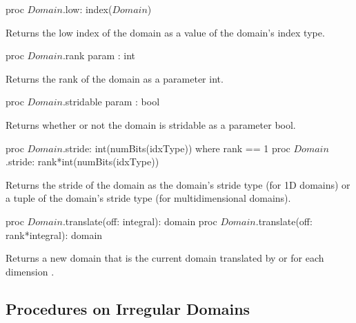 \begin{protohead}
proc $Domain$.low: index($Domain$)
\end{protohead}
\begin{protobody}
Returns the low index of the domain as a value of the domain's index
type.
\end{protobody}

\begin{protohead}
proc $Domain$.rank param : int
\end{protohead}
\begin{protobody}
Returns the rank of the domain as a parameter int.
\end{protobody}

\begin{protohead}
proc $Domain$.stridable param : bool
\end{protohead}
\begin{protobody}
Returns whether or not the domain is stridable as a parameter bool.
\end{protobody}

\begin{protohead}
proc $Domain$.stride: int(numBits(idxType)) where rank == 1
proc $Domain$.stride: rank*int(numBits(idxType))
\end{protohead}
\begin{protobody}
Returns the stride of the domain as the domain's stride type (for 1D
domains) or a tuple of the domain's stride type (for multidimensional
domains).
\end{protobody}

\begin{protohead}
proc $Domain$.translate(off: integral): domain
proc $Domain$.translate(off: rank*integral): domain
\end{protohead}
\begin{protobody}
Returns a new domain that is the current domain translated
by  or  for each dimension .
\end{protobody}


\subsection{Procedures on Irregular Domains}

